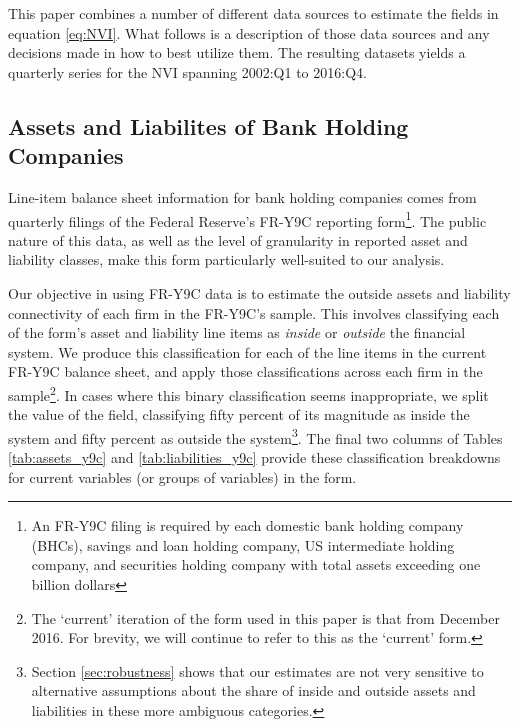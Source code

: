 This paper combines a number of different data sources to estimate the fields in equation \ref{eq:NVI}. What follows is a description of those data sources and any decisions made in how to best utilize them. The resulting datasets yields a quarterly series for the NVI spanning 2002:Q1 to 2016:Q4.

\subsection{Assets and Liabilites of Bank Holding Companies}

Line-item balance sheet information for bank holding companies comes from quarterly filings of the Federal Reserve's FR-Y9C reporting form\footnote{An FR-Y9C filing is required by each domestic bank holding company (BHCs), savings and loan holding company, US intermediate holding company, and securities holding company with total assets exceeding one billion dollars}. The public nature of this data, as well as the level of granularity in reported asset and liability classes, make this form particularly well-suited to our analysis.

Our objective in using FR-Y9C data is to estimate the outside assets and liability connectivity of each firm in the FR-Y9C's sample. This involves classifying each of the form's asset and liability line items as \textit{inside} or \textit{outside} the financial system. We produce this classification for each of the line items in the current FR-Y9C balance sheet, and apply those classifications across each firm in the sample\footnote{The `current' iteration of the form used in this paper is that from December 2016. For brevity, we will continue to refer to this as the `current' form.}. In cases where this binary classification seems inappropriate, we split the value of the field, classifying fifty percent of its magnitude as inside the system and fifty percent as outside the system\footnote{Section \ref{sec:robustness} shows that our estimates are not very sensitive to alternative assumptions about the share of inside and outside assets and liabilities in these more ambiguous categories.}. The final two columns of Tables \ref{tab:assets_y9c} and \ref{tab:liabilities_y9c} provide these classification breakdowns for current variables (or groups of variables) in the form. 


